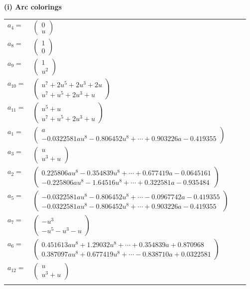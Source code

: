 \documentclass[1p]{elsarticle_modified}
\theoremstyle{definition}
\begin{document}
\flushleft \textbf{(i) Arc colorings}\\
\begin{tabular}{m{7pt} m{180pt} m{7pt} m{180pt} }
\flushright $a_{4}=$&$\begin{pmatrix}0\\u\end{pmatrix}$ \\
\flushright $a_{8}=$&$\begin{pmatrix}1\\0\end{pmatrix}$ \\
\flushright $a_{9}=$&$\begin{pmatrix}1\\u^2\end{pmatrix}$ \\
\flushright $a_{10}=$&$\begin{pmatrix}u^7+2 u^5+2 u^3+2 u\\u^7+u^5+2 u^3+u\end{pmatrix}$ \\
\flushright $a_{11}=$&$\begin{pmatrix}u^5+u\\u^7+u^5+2 u^3+u\end{pmatrix}$ \\
\flushright $a_{1}=$&$\begin{pmatrix}a\\-0.0322581 a u^{8}-0.806452 u^{8}+\cdots+0.903226 a-0.419355\end{pmatrix}$ \\
\flushright $a_{3}=$&$\begin{pmatrix}u\\u^3+u\end{pmatrix}$ \\
\flushright $a_{2}=$&$\begin{pmatrix}0.225806 a u^{8}-0.354839 u^{8}+\cdots+0.677419 a-0.0645161\\-0.225806 a u^{8}-1.64516 u^{8}+\cdots+0.322581 a-0.935484\end{pmatrix}$ \\
\flushright $a_{5}=$&$\begin{pmatrix}-0.0322581 a u^{8}-0.806452 u^{8}+\cdots-0.0967742 a-0.419355\\-0.0322581 a u^{8}-0.806452 u^{8}+\cdots+0.903226 a-0.419355\end{pmatrix}$ \\
\flushright $a_{7}=$&$\begin{pmatrix}- u^3\\- u^5- u^3- u\end{pmatrix}$ \\
\flushright $a_{6}=$&$\begin{pmatrix}0.451613 a u^{8}+1.29032 u^{8}+\cdots+0.354839 a+0.870968\\0.387097 a u^{8}+0.677419 u^{8}+\cdots-0.838710 a+0.0322581\end{pmatrix}$ \\
\flushright $a_{12}=$&$\begin{pmatrix}u\\u^3+u\end{pmatrix}$\\&\end{tabular}
\end{document}
